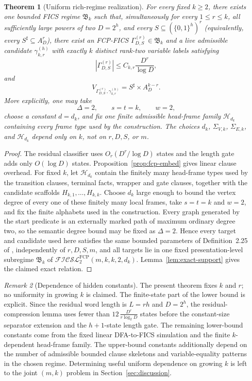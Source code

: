 \documentclass[11pt]{article}
\newtheorem{theorem}{Theorem}[section]
\theoremstyle{definition}
\theoremstyle{remark}
\newtheorem{remark}[theorem]{Remark}
\begin{document}
\begin{theorem}[Uniform rich-regime realization]
\label{prop:fiber-real}
For every fixed \(k\ge2\), there exists one bounded FICS regime
\(\mathfrak B_k\) such that, simultaneously for every \(1\le r\le k\), all
sufficiently large powers of two \(D=2^h\), and every
\(S\subseteq(\{0,1\}^h)^r\) (equivalently, every
\(S^\sharp\subseteq A_D^r\)), there exist an FCP-FICS \(\Gamma_{D,S}^{(r)}\in\mathfrak B_k\) and a \emph{live}
admissible candidate \(\gamma_{k,r}^{(h)}\) with exactly \(k\) distinct
rank-two variable labels satisfying
\[
|\Gamma_{D,S}^{(r)}|
\le
C_{k,r}\frac{D^r}{\log D},
\]
and
\[
V_{\Gamma_{D,S}^{(r)},\gamma_{k,r}^{(h)}}
=
S^\sharp\times A_D^{k-r}.
\]
More explicitly, one may take
\[
\Delta=2,\qquad s=t=k,\qquad w=2,
\]
choose a constant \(d=d_k\), and fix one finite admissible head-frame family
\(\mathcal H_{d_k}\) containing every frame type used by the construction.
The choices \(d_k\), \(\Sigma_{V,k}\), \(\Sigma_{E,k}\), and
\(\mathcal H_{d_k}\) depend only on \(k\), not on \(r,D,S\), or \(m\).
\end{theorem}

\begin{proof}
The residual classifier uses \(O_r(D^r/\log D)\) states and the length gate
adds only \(O(\log D)\) states. Proposition~\ref{prop:fcp-embed} gives linear
clause overhead.  For fixed \(k\), let \(\mathcal H_{d_k}\) contain the
finitely many head-frame types used by the transition clauses, terminal facts,
wrapper and gate clauses, together with the candidate scaffolds
\(H_{k,1},\ldots,H_{k,k}\).  Choose \(d_k\) large enough to bound the vertex
degree of every one of these finitely many local frames, take \(s=t=k\) and
\(w=2\), and fix the finite alphabets used in the construction.  Every graph
generated by the start predicate is an externally marked path of maximum
ordinary degree two, so the semantic degree bound may be fixed as
\(\Delta=2\).  Hence every target and candidate used here satisfies the same
bounded parameters of Definition~2.25 of \cite{ShoudaiEtAl2026}, independently
of \(r,D,S,m\), and all targets lie in one fixed presentation-level subregime
\(\mathfrak B_k\) of
\(\mathcal{FICSL}^{\mathrm{FCP}}_{2}(m,k,k,2,d_k).\)
Lemma~\ref{lem:exact-support} gives the claimed exact relation.
\end{proof}

\begin{remark}[Dependence of hidden constants]
The present theorem fixes \(k\) and \(r\); no uniformity in growing \(k\) is
claimed.  The finite-state part of the lower bound is explicit.  Since the
residual word length is \(L=rh\) and \(D=2^h\), the residual-compression lemma
uses fewer than
\(12\,\frac{D^r}{r\log_2 D}\)
states before the constant-size separator extension and the \(h+1\)-state
length gate.  The remaining lower-bound constants come from the fixed linear
DFA-to-FICS simulation and the finite \(k\)-dependent head-frame family.  The
upper-bound constants additionally depend on the number of admissible bounded
clause skeletons and variable-equality patterns in the chosen regime.
Determining useful uniform dependence on growing \(k\) is left to the joint
\((m,k)\) problem in Section~\ref{sec:discussion}.
\end{remark}
\end{document}
